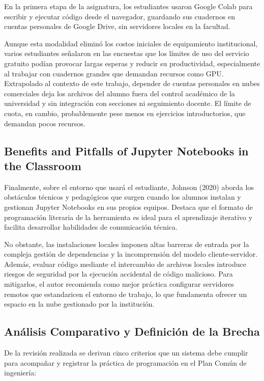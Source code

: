 En la primera etapa de la asignatura, los estudiantes usaron Google Colab para escribir y ejecutar código desde el navegador, guardando sus cuadernos en cuentas personales de Google Drive, sin servidores locales en la facultad.

Aunque esta modalidad eliminó los costos iniciales de equipamiento institucional, varios estudiantes señalaron en las encuestas que los límites de uso del servicio gratuito podían provocar largas esperas y reducir su productividad, especialmente al trabajar con cuadernos grandes que demandan recursos como GPU. Extrapolado al contexto de este trabajo, depender de cuentas personales en nubes comerciales deja los archivos del alumno fuera del control académico de la universidad y sin integración con secciones ni seguimiento docente. El límite de cuota, en cambio, probablemente pese menos en ejercicios introductorios, que demandan pocos recursos.

\subsection{Benefits and Pitfalls of Jupyter Notebooks in the Classroom}
Finalmente, sobre el entorno que usará el estudiante, Johnson (2020) \cite{johnson2020benefits} aborda los obstáculos técnicos y pedagógicos que surgen cuando los alumnos instalan y gestionan Jupyter Notebooks en sus propios equipos. Destaca que el formato de programación literaria de la herramienta es ideal para el aprendizaje iterativo y facilita desarrollar habilidades de comunicación técnica.

No obstante, las instalaciones locales imponen altas barreras de entrada por la compleja gestión de dependencias y la incomprensión del modelo cliente-servidor. Además, evaluar código mediante el intercambio de archivos locales introduce riesgos de seguridad por la ejecución accidental de código malicioso. Para mitigarlos, el autor recomienda como mejor práctica configurar servidores remotos que estandaricen el entorno de trabajo, lo que fundamenta ofrecer un espacio en la nube gestionado por la institución.

\subsection{Análisis Comparativo y Definición de la Brecha}

De la revisión realizada se derivan cinco criterios que un sistema debe cumplir para acompañar y registrar la práctica de programación en el Plan Común de ingeniería:

